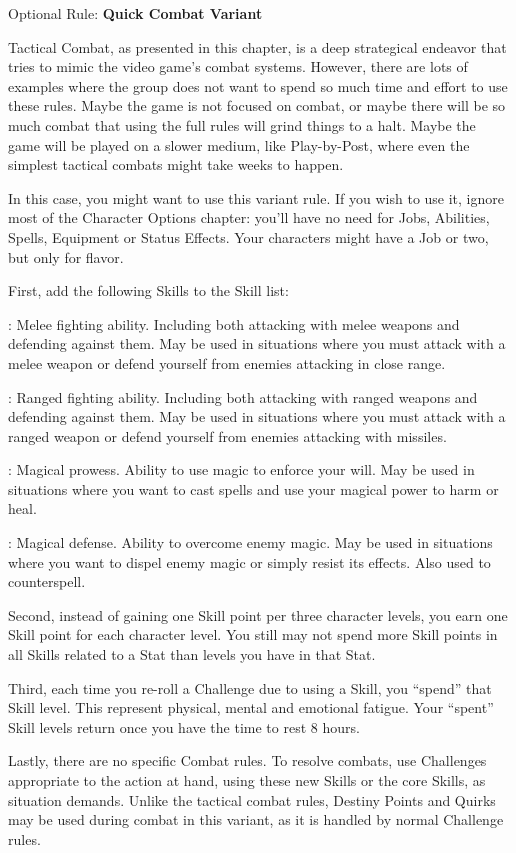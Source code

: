 \begin{multiboco}
Optional Rule: \textbf{Quick Combat Variant}

Tactical Combat, as presented in this chapter, is a deep strategical endeavor that tries to mimic the video game's combat systems. However, there are lots of examples where the group does not want to spend so much time and effort to use these rules. Maybe the game is not focused on combat, or maybe there will be so much combat that using the full rules will grind things to a halt. Maybe the game will be played on a slower medium, like Play-by-Post, where even the simplest tactical combats might take weeks to happen.

In this case, you might want to use this variant rule. If you wish to use it, ignore most of the Character Options chapter: you'll have no need for Jobs, Abilities, Spells, Equipment or Status Effects. Your characters might have a Job or two, but only for flavor.

First, add the following Skills to the Skill list:

: Melee fighting ability. Including both attacking with melee weapons and defending against them. May be used in situations where you must attack with a melee weapon or defend yourself from enemies attacking in close range.

: Ranged fighting ability. Including both attacking with ranged weapons and defending against them. May be used in situations where you must attack with a ranged weapon or defend yourself from enemies attacking with missiles.

: Magical prowess. Ability to use magic to enforce your will. May be used in situations where you want to cast spells and use your magical power to harm or heal.

: Magical defense. Ability to overcome enemy magic. May be used in situations where you want to dispel enemy magic or simply resist its effects. Also used to counterspell.

Second, instead of gaining one Skill point per three character levels, you earn one Skill point for each character level. You still may not spend more Skill points in all Skills related to a Stat than levels you have in that Stat.

Third, each time you re-roll a Challenge due to using a Skill, you ``spend'' that Skill level. This represent physical, mental and emotional fatigue. Your ``spent'' Skill levels return once you have the time to rest 8 hours.

Lastly, there are no specific Combat rules. To resolve combats, use Challenges appropriate to the action at hand, using these new Skills or the core Skills, as situation demands. Unlike the tactical combat rules, Destiny Points and Quirks may be used during combat in this variant, as it is handled by normal Challenge rules.
\end{multiboco}

